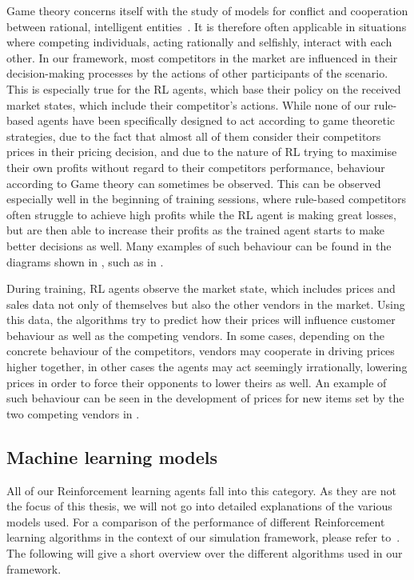 Game theory concerns itself with the study of models for conflict and cooperation between rational, intelligent entities~\cite{GameTheory}. It is therefore often applicable in situations where competing individuals, acting rationally and selfishly, interact with each other. In our framework, most competitors in the market are influenced in their decision-making processes by the actions of other participants of the scenario. This is especially true for the RL agents, which base their policy on the received market states, which include their competitor's actions. While none of our rule-based agents have been specifically designed to act according to game theoretic strategies, due to the fact that almost all of them consider their competitors prices in their pricing decision, and due to the nature of RL trying to maximise their own profits without regard to their competitors performance, behaviour according to Game theory can sometimes be observed. This can be observed especially well in the beginning of training sessions, where rule-based competitors often struggle to achieve high profits while the RL agent is making great losses, but are then able to increase their profits as the trained agent starts to make better decisions as well. Many examples of such behaviour can be found in the diagrams shown in , such as in .

During training, RL agents observe the market state, which includes prices and sales data not only of themselves but also the other vendors in the market. Using this data, the algorithms try to predict how their prices will influence customer behaviour as well as the competing vendors. In some cases, depending on the concrete behaviour of the competitors, vendors may cooperate in driving prices higher together, in other cases the agents may act seemingly irrationally, lowering prices in order to force their opponents to lower theirs as well. An example of such behaviour can be seen in the development of prices for new items set by the two competing vendors in .

\subsection{Machine learning models}\label{subsec:MachineLearningModels}

All of our Reinforcement learning agents fall into this category. As they are not the focus of this thesis, we will not go into detailed explanations of the various models used. For a comparison of the performance of different Reinforcement learning algorithms in the context of our simulation framework, please refer to~\cite{JanThesis}. The following will give a short overview over the different algorithms used in our framework.

